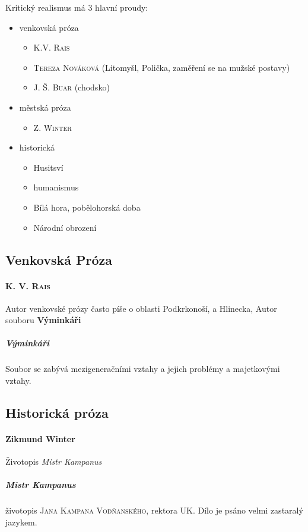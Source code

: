 \documentclass[10pt,a4page,headings,openany,%
oneside
,twocolumn
]{report}
\begin{document}
Kritický realismus má 3 hlavní proudy:
\begin{itemize}
\item venkovská próza
	\begin{itemize}
	\item \textsc{K.V. Rais} 
	\item \textsc{Tereza Nováková} (Litomyšl, Polička, zaměření se na mužské postavy)
	\item \textsc{J. Š. Buar} (chodsko)
	\end{itemize}
\item městská próza
\begin{itemize}
\item \textsc{Z. Winter}
\end{itemize}
\item historická \begin{itemize}
	\item Husitsví
	\item humanismus
	\item Bílá hora, pobělohorská doba
	\item Národní obrození
	\end{itemize}

\end{itemize}

\subsection{Venkovská Próza}
\paragraph{\textsc{K. V. Rais}} Autor venkovské prózy často píše o oblasti Podkrkonoší, a Hlinecka, Autor souboru \textbf{Výminkáři}

\subparagraph{Výminkáři} Soubor se zabývá mezigeneračními vztahy a jejich problémy a majetkovými vztahy.

\subsection{Historická próza}
\paragraph{Zikmund Winter} Životopis \emph{Mistr Kampanus}

\subparagraph{Mistr Kampanus} životopis \textsc{Jana Kampana Vodňanského},  rektora UK. Dílo je psáno velmi zastaralý jazykem.
\end{document}
